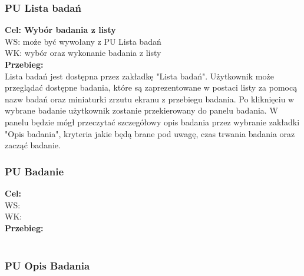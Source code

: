 \documentclass[12pt, letterpaper]{article}
\begin{document}
		
		\subsubsection{PU Lista badań}
		
		\quad
		
		\textbf{Cel: Wybór badania z listy}\\
		
		WS: może być wywołany z PU Lista badań\\
		
		WK: wybór oraz wykonanie badania z listy\\
		
		\textbf{Przebieg:}\\
		Lista badań jest dostępna przez zakładkę "Lista badań". Użytkownik może przeglądać dostępne badania, które są zaprezentowane w postaci listy za pomocą nazw badań oraz miniaturki zrzutu ekranu z przebiegu badania. Po kliknięciu w wybrane badanie użytkownik zostanie przekierowany do panelu badania. W panelu będzie mógł przeczytać szczegółowy opis badania przez wybranie zakładki "Opis badania", kryteria jakie będą brane pod uwagę, czas trwania badania oraz zacząć badanie. \\
		
		
		\subsubsection{PU Badanie}
		
		\quad
		
		\textbf{Cel: }\\
		
		WS: \\
		
		WK: \\
		
		\textbf{Przebieg:}\\
		 \\
		 
		
		\subsubsection{PU Opis Badania}
		
\end{document}
